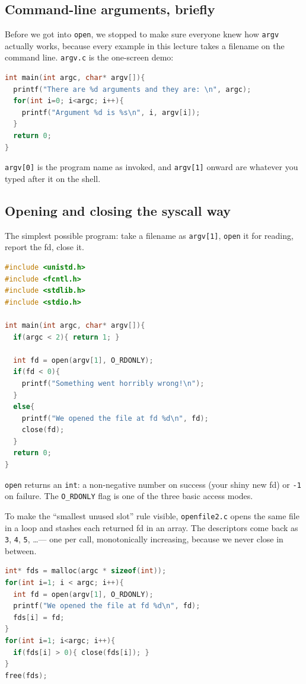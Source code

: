 \documentclass[11pt]{article}
\begin{document}
\subsection*{Command-line arguments, briefly}

Before we got into \texttt{open}, we stopped to make sure everyone
knew how \texttt{argv} actually works, because every example in this
lecture takes a filename on the command line. \texttt{argv.c} is the
one-screen demo:

\begin{lstlisting}[language=C]
int main(int argc, char* argv[]){
  printf("There are %d arguments and they are: \n", argc);
  for(int i=0; i<argc; i++){
    printf("Argument %d is %s\n", i, argv[i]);
  }
  return 0;
}
\end{lstlisting}

\texttt{argv[0]} is the program name as invoked, and \texttt{argv[1]}
onward are whatever you typed after it on the shell.

\subsection*{Opening and closing the syscall way}

The simplest possible program: take a filename as \texttt{argv[1]},
\texttt{open} it for reading, report the fd, close it.

\begin{lstlisting}[language=C]
#include <unistd.h>
#include <fcntl.h>
#include <stdlib.h>
#include <stdio.h>

int main(int argc, char* argv[]){
  if(argc < 2){ return 1; }

  int fd = open(argv[1], O_RDONLY);
  if(fd < 0){
    printf("Something went horribly wrong!\n");
  }
  else{
    printf("We opened the file at fd %d\n", fd);
    close(fd);
  }
  return 0;
}
\end{lstlisting}

\texttt{open} returns an \texttt{int}: a non-negative number on
success (your shiny new fd) or \texttt{-1} on failure. The
\texttt{O\_RDONLY} flag is one of the three basic access modes.

To make the ``smallest unused slot'' rule visible, \texttt{openfile2.c}
opens the same file in a loop and stashes each returned fd in an
array. The descriptors come back as \texttt{3}, \texttt{4}, \texttt{5},
\ldots --- one per call, monotonically increasing, because we never
close in between.

\begin{lstlisting}[language=C]
int* fds = malloc(argc * sizeof(int));
for(int i=1; i < argc; i++){
  int fd = open(argv[1], O_RDONLY);
  printf("We opened the file at fd %d\n", fd);
  fds[i] = fd;
}
for(int i=1; i<argc; i++){
  if(fds[i] > 0){ close(fds[i]); }
}
free(fds);
\end{lstlisting}
\end{document}

